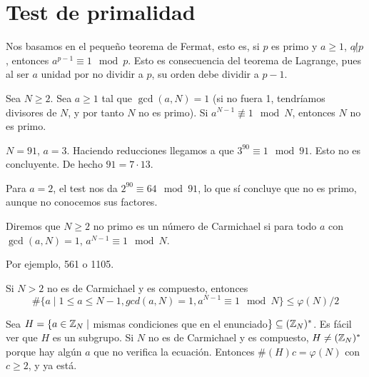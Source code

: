 \documentclass[CR.tex]{subfiles}
\begin{document}
\section{Test de primalidad}
Nos basamos en el pequeño teorema de Fermat, esto es, si $p$ es primo y $a\geq 1$, $a\not| p$, entonces $a^{p-1}\equiv 1\mod p$. Esto es consecuencia del teorema de Lagrange, pues al ser $a$ unidad por no dividir a $p$, su orden debe dividir a $p-1$. 

Sea $N\geq 2$. Sea $a\geq 1$ tal que $\gcd(a,N)=1$ (si no fuera 1, tendríamos divisores de $N$, y por tanto $N$ no es primo). Si $a^{N-1}\not\equiv 1\mod N$, entonces $N$ no es primo.

\begin{ej}
$N=91$, $a=3$. Haciendo reducciones llegamos a que $3^{90}\equiv 1\mod 91$. Esto no es concluyente. De hecho $91=7\cdot 13$. 

Para $a=2$, el test nos da $2^{90}\equiv 64\mod 91$, lo que sí concluye que no es primo, aunque no conocemos sus factores. 
\end{ej}


\begin{defi}
Diremos que $N\geq 2$ no primo es un número de Carmichael si para todo $a$ con $\gcd(a,N)=1$, $a^{N-1}\equiv 1\mod N$.
\end{defi}

Por ejemplo, 561 o 1105. 

\begin{prop}
Si $N>2$ no es de Carmichael y es compuesto, entonces 
\[
\#\{a\mid 1\leq a\leq N-1, gcd(a,N)=1, a^{N-1}\equiv 1\mod N\}\leq \varphi(N)/2 
\]
\end{prop}
\begin{dem}
Sea $H=\{a\in\mathbb{Z}_N\mid$ mismas condiciones que en el enunciado$\}\subseteq (\mathbb{Z}_N)^*$. Es fácil ver que $H$ es un subgrupo. Si $N$ no es de Carmichael y es compuesto, $H\neq (\mathbb{Z}_N)^*$ porque hay algún $a$ que no verifica la ecuación. Entonces $\#(H)c=\varphi(N)$ con $c\geq 2$, y ya está. 
\end{dem}
\end{document}
